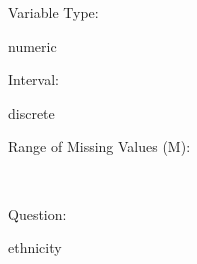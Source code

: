 \documentclass[
]{article}
\begin{document}
\begin{minipage}[t]{0.3\linewidth}

Variable Type:

\end{minipage}%
\begin{minipage}[t]{0.7\linewidth}

numeric

\end{minipage}

\begin{minipage}[t]{0.3\linewidth}

Interval:

\end{minipage}%
\begin{minipage}[t]{0.7\linewidth}

discrete

\end{minipage}

\begin{minipage}[t]{0.3\linewidth}

Range of Missing Values (M):

\end{minipage}%
\begin{minipage}[t]{0.7\linewidth}

~

\end{minipage}

\begin{minipage}[t]{0.3\linewidth}

Question:

\end{minipage}%
\begin{minipage}[t]{0.7\linewidth}

ethnicity

\end{minipage}
\end{document}
